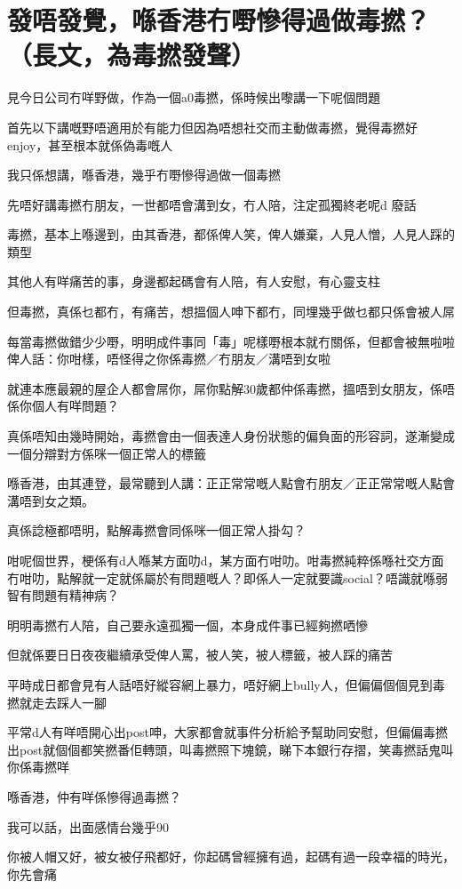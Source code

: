\chapter{發唔發覺，喺香港冇嘢慘得過做毒撚？（長文，為毒撚發聲）}

見今日公司冇咩野做，作為一個a0毒撚，係時候出嚟講一下呢個問題

首先以下講嘅野唔適用於有能力但因為唔想社交而主動做毒撚，覺得毒撚好enjoy，甚至根本就係偽毒嘅人

我只係想講，喺香港，幾乎冇嘢慘得過做一個毒撚

先唔好講毒撚冇朋友，一世都唔會溝到女，冇人陪，注定孤獨終老呢d 廢話

毒撚，基本上喺邊到，由其香港，都係俾人笑，俾人嫌棄，人見人憎，人見人踩的類型

其他人有咩痛苦的事，身邊都起碼會有人陪，有人安慰，有心靈支柱

但毒撚，真係乜都冇，有痛苦，想搵個人呻下都冇，同埋幾乎做乜都只係會被人屌

每當毒撚做錯少少嘢，明明成件事同「毒」呢樣嘢根本就冇關係，但都會被無啦啦俾人話：你咁樣，唔怪得之你係毒撚／冇朋友／溝唔到女啦

就連本應最親的屋企人都會屌你，屌你點解30歲都仲係毒撚，搵唔到女朋友，係唔係你個人有咩問題？

真係唔知由幾時開始，毒撚會由一個表達人身份狀態的偏負面的形容詞，遂漸變成一個分辯對方係咪一個正常人的標籤

喺香港，由其連登，最常聽到人講：正正常常嘅人點會冇朋友／正正常常嘅人點會溝唔到女之類。

真係諗極都唔明，點解毒撚會同係咪一個正常人掛勾？

咁呢個世界，梗係有d人喺某方面叻d，某方面冇咁叻。咁毒撚純粹係喺社交方面冇咁叻，點解就一定就係屬於有問題嘅人？即係人一定就要識social？唔識就喺弱智有問題有精神病？

明明毒撚冇人陪，自己要永遠孤獨一個，本身成件事已經夠撚哂慘

但就係要日日夜夜繼續承受俾人罵，被人笑，被人標籤，被人踩的痛苦

平時成日都會見有人話唔好縱容網上暴力，唔好網上bully人，但偏偏個個見到毒撚就走去踩人一腳

平常d人有咩唔開心出post呻，大家都會就事件分析給予幫助同安慰，但偏偏毒撚出post就個個都笑撚番佢轉頭，叫毒撚照下塊鏡，睇下本銀行存摺，笑毒撚話鬼叫你係毒撚咩

喺香港，仲有咩係慘得過毒撚？

我可以話，出面感情台幾乎90%

你被人帽又好，被女被仔飛都好，你起碼曾經擁有過，起碼有過一段幸福的時光，你先會痛

